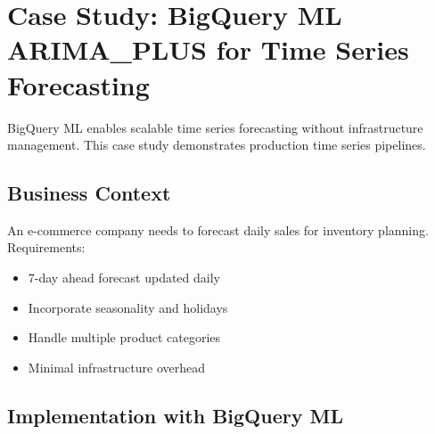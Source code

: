 \section{Case Study: BigQuery ML ARIMA\_PLUS for Time Series Forecasting}

BigQuery ML enables scalable time series forecasting without infrastructure management. This case study demonstrates production time series pipelines.

\subsection{Business Context}

An e-commerce company needs to forecast daily sales for inventory planning. Requirements:
\begin{itemize}
    \item 7-day ahead forecast updated daily
    \item Incorporate seasonality and holidays
    \item Handle multiple product categories
    \item Minimal infrastructure overhead
\end{itemize}

\subsection{Implementation with BigQuery ML}

